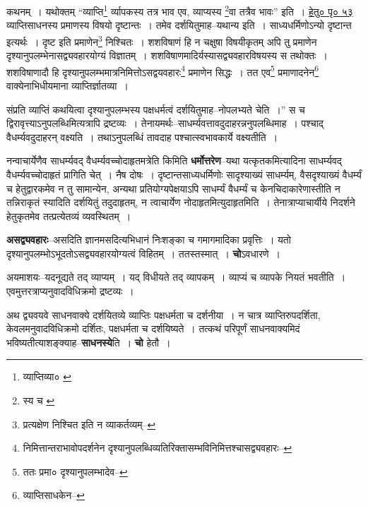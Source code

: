 \documentclass[article,12pt,a4paper]{memoir}
\begin{document}
	कथनम् । यथोक्तम् “व्याप्ति\footnote{व्याप्तिव्या० \cite{dp-msA}} र्व्यापकस्य तत्र भाव एव, व्याप्यस्य \footnote{स्य च \cite{dp-msB} \cite{dp-msC} \cite{dp-msD} \cite{dp-edP} \cite{dp-edH} \cite{dp-edE} \cite{dp-edN}}\-वा तत्रैव भावः” इति । \href{http://http://sarit.indology.info/?cref=hb.1.4}{हेतु० पृ० ५३} व्याप्तिसाधनस्य प्रमाणस्य विषयो दृष्टान्तः । तमेव दर्शयितुमाह--यथान्य इति । साध्यधर्मिणोऽन्यो दृष्टान्त इत्यर्थः । दृष्ट इति प्रमाणेन\footnote{प्रत्यक्षेण निश्चित इति न व्याकर्तव्यम्--\cite{dp-msD-n}} निश्चितः । शशविषाणं हि न चक्षुषा विषयीकृतम् अपि तु प्रमाणेन दृश्यानुपलम्भेनासद्व्यवहारयोग्यं विज्ञातम् । शशविषाणमादिर्यस्यासद्व्यवहारविषयस्य स तथोक्तः । शशविषाणादौ हि दृश्यानुपलम्भमात्रनिमित्तोऽसद्वयवहारः\footnote{निमित्तान्तराभावोपदर्शनेन दृश्यानुपलब्धिव्यतिरिक्तासम्भविनिमित्तश्चासद्व्यवहारः--\cite{dp-msD-n}} प्रमाणेन सिद्धः । तत एव\footnote{ततः प्रमा० \cite{dp-msC} दृश्यानुपलम्भादेव--\cite{dp-msD-n}} प्रमाणादनेन\footnote{व्याप्तिसाधकेन--\cite{dp-msD-n}} वाक्येनाभिधीयमाना व्याप्तिर्ज्ञातव्या । 
	  
	संप्रति व्याप्तिं कथयित्वा दृश्यानुपलम्भस्य पक्षधर्मत्वं दर्शयितुमाह--नोपलभ्यते चेति ।” स च द्विरावृत्त्याऽनुपलब्धिमित्यत्रापि द्रष्टव्यः । तेनायमर्थः--साधर्म्यवत्तावदुदाहरन्ननुपलब्धिमाह । पश्चाद् वैधर्म्यवदुदाहरन् वक्ष्यति । तथाऽनुपलब्धिं तावदाह पश्चात्स्वभावकार्ये वक्ष्यतीति ।
	\pend
      

	  \pstart नन्वाचार्येणैव साधर्म्यवद् वैधर्म्यवच्चोदाहृतमत्रेति किमिति \textbf{धर्मोत्तरेण}--यथा यत्कृतकमित्यादिना साधर्म्यवद् वैधर्म्यवच्चोदाहृतं प्रागिति चेत् । नैष दोषः । दृष्टान्तसाध्यधर्मिणोः सादृश्याख्यं साधर्म्यम्, वैसदृश्याख्यं वैधर्म्यं च हेतुद्वारकमेव न तु सामान्येन, अन्यथा प्रतियोग्यपेक्षयाऽपि साधर्म्यं वैधर्म्यं च केनचिदाकारेणास्तीति न तन्निराकृतं स्यादिति दर्शयितुं तदुदाहृतम्, न त्वाचार्येण नोदाहृतमित्युदाहृतमिति । तेनात्राप्याचार्यीये निदर्शने हेतुकृतमेव तत्प्रत्येतव्यं व्यवस्थितम् ।
	\pend
      

	  \pstart \textbf{असद्व्यवहारः}--असदिति ज्ञानमसदित्यभिधानं निःशङ्का च गमागमादिका प्रवृत्तिः । यतो दृश्यानुपलम्भोऽभूदतोऽसद्व्यवहारयोग्यत्वं विहितम् । ततस्तस्मात् । \textbf{चो}ऽवधारणे ।
	\pend
      

	  \pstart अयमाशयः--यदनूद्यते तद् व्याप्यम् । यद् विधीयते तद् व्यापकम् । व्याप्यं च व्यापके नियतं भवतीति । एवमुत्तरत्राप्यनुवादविधिक्रमो द्रष्टव्यः ।
	\pend
      

	  \pstart अथ द्व्यवयवे साधनवाक्ये दर्शयितव्ये व्याप्तिः पक्षधर्मता च दर्शनीया । न चात्र व्याप्तिरुपदर्शिता, केवलमनुवादविधिक्रमो दर्शितः, पक्षधर्मता च दर्शयिष्यते । तत्कथं परिपूर्णं साधनवाक्यमिदं भविष्यतीत्याशङ्क्याह--\textbf{साधनस्ये}ति । \textbf{चो} हेतौ ।
	\pend
      
\end{document}
